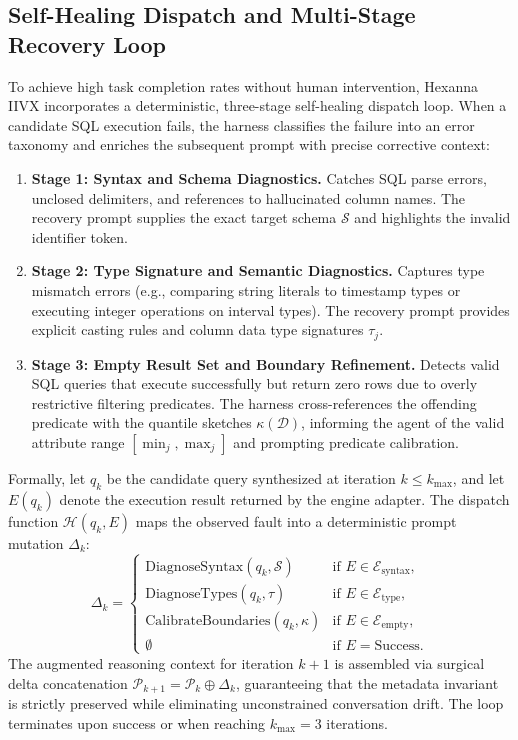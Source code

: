 \subsection{Self-Healing Dispatch and Multi-Stage Recovery Loop}
To achieve high task completion rates without human intervention, Hexanna IIVX incorporates a deterministic, three-stage self-healing dispatch loop. When a candidate SQL execution fails, the harness classifies the failure into an error taxonomy and enriches the subsequent prompt with precise corrective context:

\begin{enumerate}
    \item \textbf{Stage 1: Syntax and Schema Diagnostics.} Catches SQL parse errors, unclosed delimiters, and references to hallucinated column names. The recovery prompt supplies the exact target schema $\mathcal{S}$ and highlights the invalid identifier token.
    \item \textbf{Stage 2: Type Signature and Semantic Diagnostics.} Captures type mismatch errors (e.g., comparing string literals to timestamp types or executing integer operations on interval types). The recovery prompt provides explicit casting rules and column data type signatures $\tau_j$.
    \item \textbf{Stage 3: Empty Result Set and Boundary Refinement.} Detects valid SQL queries that execute successfully but return zero rows due to overly restrictive filtering predicates. The harness cross-references the offending predicate with the quantile sketches $\kappa(\mathcal{D})$, informing the agent of the valid attribute range $[\min_j, \max_j]$ and prompting predicate calibration.
\end{enumerate}

Formally, let $q_k$ be the candidate query synthesized at iteration $k \le k_{\max}$, and let $E(q_k)$ denote the execution result returned by the engine adapter. The dispatch function $\mathcal{H}(q_k, E)$ maps the observed fault into a deterministic prompt mutation $\Delta_k$:
\begin{equation}
    \Delta_k = \begin{cases}
    \text{DiagnoseSyntax}(q_k, \mathcal{S}) & \text{if } E \in \mathcal{E}_{\text{syntax}}, \\
    \text{DiagnoseTypes}(q_k, \tau) & \text{if } E \in \mathcal{E}_{\text{type}}, \\
    \text{CalibrateBoundaries}(q_k, \kappa) & \text{if } E \in \mathcal{E}_{\text{empty}}, \\
    \emptyset & \text{if } E = \text{Success}.
    \end{cases}
\end{equation}
The augmented reasoning context for iteration $k+1$ is assembled via surgical delta concatenation $\mathcal{P}_{k+1} = \mathcal{P}_k \oplus \Delta_k$, guaranteeing that the metadata invariant is strictly preserved while eliminating unconstrained conversation drift. The loop terminates upon success or when reaching $k_{\max} = 3$ iterations.

